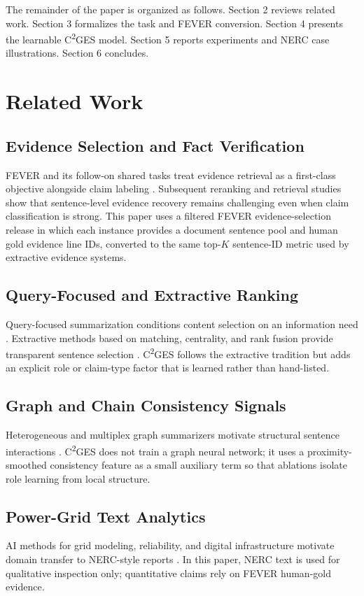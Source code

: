 \documentclass[applsci,article,submit,moreauthors]{Definitions/mdpi}
\newcommand{\cges}{C\textsuperscript{2}GES}
\begin{document}
The remainder of the paper is organized as follows. Section 2 reviews related work. Section 3 formalizes the task and FEVER conversion. Section 4 presents the learnable \cges{} model. Section 5 reports experiments and NERC case illustrations. Section 6 concludes.

\section{Related Work}
\label{sec:related_work}

\subsection{Evidence Selection and Fact Verification}
FEVER and its follow-on shared tasks treat evidence retrieval as a first-class objective alongside claim labeling \cite{thorne2018fever}. Subsequent reranking and retrieval studies show that sentence-level evidence recovery remains challenging even when claim classification is strong. This paper uses a filtered FEVER evidence-selection release in which each instance provides a document sentence pool and human gold evidence line IDs, converted to the same top-$K$ sentence-ID metric used by extractive evidence systems.

\subsection{Query-Focused and Extractive Ranking}
Query-focused summarization conditions content selection on an information need \cite{zhong2021qmsum,liu2023rank,sotudeh2024rank}. Extractive methods based on matching, centrality, and rank fusion provide transparent sentence selection \cite{zhong2020extractive,bi2021aredsum,khor2021text}. \cges{} follows the extractive tradition but adds an explicit role or claim-type factor that is learned rather than hand-listed.

\subsection{Graph and Chain Consistency Signals}
Heterogeneous and multiplex graph summarizers motivate structural sentence interactions \cite{wang2020heterogeneous,jing2021multiplex}. \cges{} does not train a graph neural network; it uses a proximity-smoothed consistency feature as a small auxiliary term so that ablations isolate role learning from local structure.

\subsection{Power-Grid Text Analytics}
AI methods for grid modeling, reliability, and digital infrastructure motivate domain transfer to NERC-style reports \cite{xie2022massively,srinivasan2023artificial,hamann2024foundation,madabhushi2023survey}. In this paper, NERC text is used for qualitative inspection only; quantitative claims rely on FEVER human-gold evidence.
\end{document}
